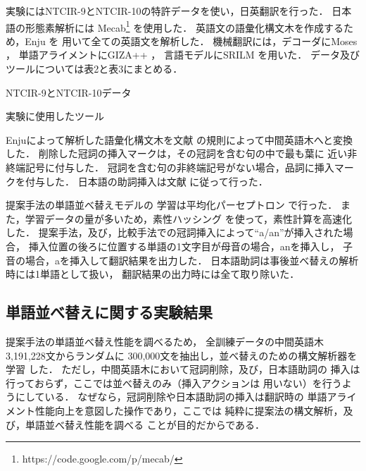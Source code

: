 \documentclass[japanese]{jnlp_1.4}
\begin{document}
実験にはNTCIR-9とNTCIR-10の特許データを使い，日英翻訳を行った．
日本語の形態素解析には
Mecab\footnote{https://code.google.com/p/mecab/}
を使用した．
英語文の語彙化構文木を作成するため，Enju \cite{Miyao:08}を
用いて全ての英語文を解析した．
機械翻訳には，デコーダにMoses \cite{Koehn:07}，
単語アライメントにGIZA++ \cite{Och:03:sys}，
言語モデルにSRILM \cite{Stolcke:11}を用いた．
データ及びツールについては表2と表3にまとめる．

\begin{table}[b]
\begin{minipage}{0.5\textwidth}
\caption{NTCIR-9とNTCIR-10データ}
\label{tab:data}

\end{minipage}
\begin{minipage}{0.5\hsize}
\caption{実験に使用したツール}
\label{tab:tool}

\end{minipage}
\end{table}

Enjuによって解析した語彙化構文木を文献 \cite{Isozaki:12}
の規則によって中間英語木へと変換した．
削除した冠詞の挿入マークは，その冠詞を含む句の中で最も葉に
近い非終端記号に付与した．
冠詞を含む句の非終端記号がない場合，品詞に挿入マークを付与した．
日本語の助詞挿入は文献 \cite{Isozaki:12}に従って行った．

提案手法の単語並べ替えモデルの
学習は平均化パーセプトロン \cite{Collins:04}で行った．
また，学習データの量が多いため，素性ハッシング \cite{Shi:09}
を使って，素性計算を高速化した．
提案手法，及び，比較手法での冠詞挿入によって``a/an''が挿入された場合，
挿入位置の後ろに位置する単語の1文字目が母音の場合，anを挿入し，
子音の場合，aを挿入して翻訳結果を出力した．
日本語助詞は事後並べ替えの解析時には1単語として扱い，
翻訳結果の出力時には全て取り除いた．


\subsection{単語並べ替えに関する実験結果}
\label{sec:exp_amb}

提案手法の単語並べ替え性能を調べるため，
全訓練データの中間英語木3,191,228文からランダムに
300,000文を抽出し，並べ替えのための構文解析器を学習
した．
ただし，中間英語木において冠詞削除，及び，日本語助詞の
挿入は行っておらず，ここでは並べ替えのみ（挿入アクションは
用いない）を行うようにしている．
なぜなら，冠詞削除や日本語助詞の挿入は翻訳時の
単語アライメント性能向上を意図した操作であり，ここでは
純粋に提案法の構文解析，及び，単語並べ替え性能を調べる
ことが目的だからである．
\end{document}
